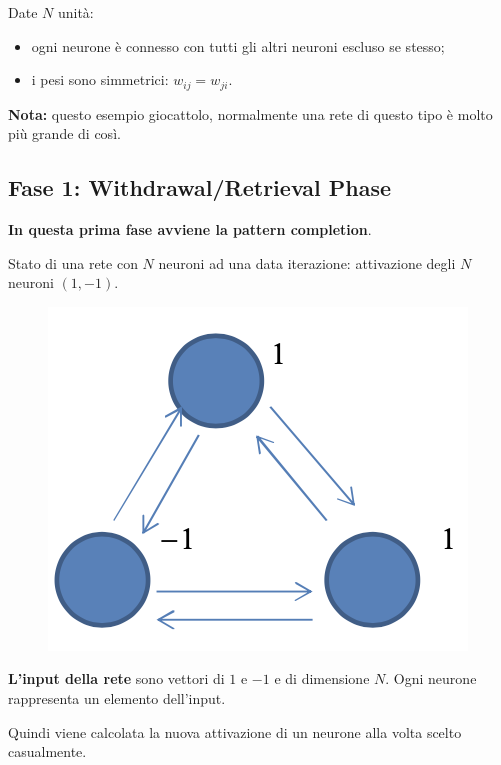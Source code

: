 Date $N$ unità:
\begin{itemize}
    \item ogni neurone è connesso con tutti gli altri neuroni escluso se stesso;
    \item i pesi sono simmetrici: $w_{ij}=w_{ji}$.
\end{itemize}
\textbf{Nota:} questo esempio giocattolo, normalmente una rete di questo tipo è molto più grande di così.

\newpage
\subsection{Fase 1: Withdrawal/Retrieval Phase}
\textbf{In questa prima fase avviene la pattern completion}.



Stato di una rete con $N$ neuroni ad una data iterazione: attivazione degli $N$ neuroni $(1,- 1)$.
\begin{figure}[!h]
    \includegraphics[scale=.7]{images/hopfield_networks/first_phase.png}
    \centering
\end{figure}



\textbf{L'input della rete} sono vettori di $1$ e $-1$ e di dimensione $N$. Ogni neurone rappresenta un elemento dell'input.



Quindi viene calcolata la nuova attivazione di un neurone alla volta scelto casualmente.



